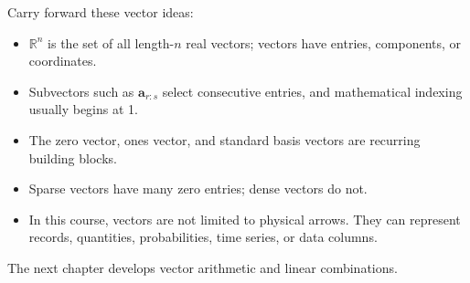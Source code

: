 Carry forward these vector ideas:
\begin{itemize}
    \item \(\mathbb{R}^n\) is the set of all length-\(n\) real vectors; vectors have entries, components, or coordinates.
    \item Subvectors such as \(\mathbf{a}_{r:s}\) select consecutive entries, and mathematical indexing usually begins at 1.
    \item The zero vector, ones vector, and standard basis vectors are recurring building blocks.
    \item Sparse vectors have many zero entries; dense vectors do not.
    \item In this course, vectors are not limited to physical arrows. They can represent records, quantities, probabilities, time series, or data columns.
\end{itemize}

The next chapter develops vector arithmetic and linear combinations.
